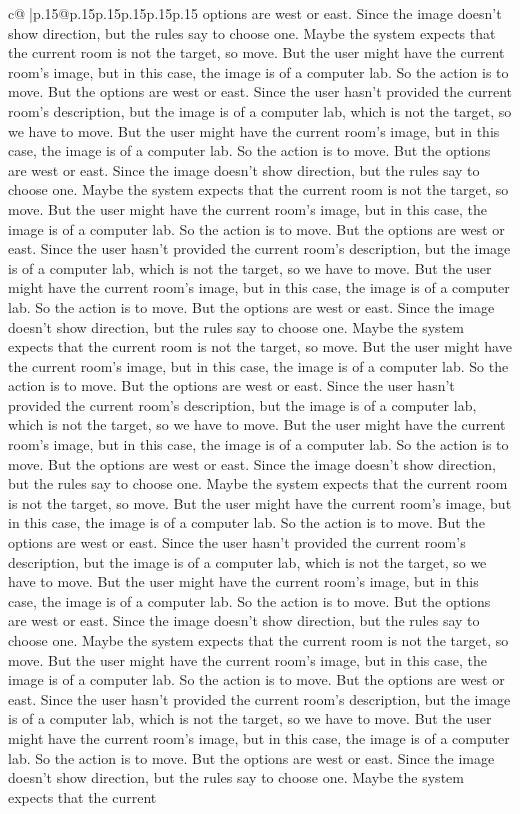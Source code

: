 \documentclass{article}
\begin{document}
{\begin{supertabular}{c@{$\;$}|p{.15\linewidth}@{}p{.15\linewidth}p{.15\linewidth}p{.15\linewidth}p{.15\linewidth}p{.15\linewidth}}
{{{options are west or east. Since the image doesn't show direction, but the rules say to choose one. Maybe the system expects that the current room is not the target, so move. But the user might have the current room's image, but in this case, the image is of a computer lab. So the action is to move. But the options are west or east. Since the user hasn't provided the current room's description, but the image is of a computer lab, which is not the target, so we have to move. But the user might have the current room's image, but in this case, the image is of a computer lab. So the action is to move. But the options are west or east. Since the image doesn't show direction, but the rules say to choose one. Maybe the system expects that the current room is not the target, so move. But the user might have the current room's image, but in this case, the image is of a computer lab. So the action is to move. But the options are west or east. Since the user hasn't provided the current room's description, but the image is of a computer lab, which is not the target, so we have to move. But the user might have the current room's image, but in this case, the image is of a computer lab. So the action is to move. But the options are west or east. Since the image doesn't show direction, but the rules say to choose one. Maybe the system expects that the current room is not the target, so move. But the user might have the current room's image, but in this case, the image is of a computer lab. So the action is to move. But the options are west or east. Since the user hasn't provided the current room's description, but the image is of a computer lab, which is not the target, so we have to move. But the user might have the current room's image, but in this case, the image is of a computer lab. So the action is to move. But the options are west or east. Since the image doesn't show direction, but the rules say to choose one. Maybe the system expects that the current room is not the target, so move. But the user might have the current room's image, but in this case, the image is of a computer lab. So the action is to move. But the options are west or east. Since the user hasn't provided the current room's description, but the image is of a computer lab, which is not the target, so we have to move. But the user might have the current room's image, but in this case, the image is of a computer lab. So the action is to move. But the options are west or east. Since the image doesn't show direction, but the rules say to choose one. Maybe the system expects that the current room is not the target, so move. But the user might have the current room's image, but in this case, the image is of a computer lab. So the action is to move. But the options are west or east. Since the user hasn't provided the current room's description, but the image is of a computer lab, which is not the target, so we have to move. But the user might have the current room's image, but in this case, the image is of a computer lab. So the action is to move. But the options are west or east. Since the image doesn't show direction, but the rules say to choose one. Maybe the system expects that the current }}}
\end{supertabular}}
\end{document}
